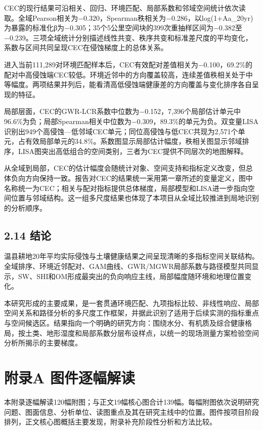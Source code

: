 \documentclass[
  11pt,
  a4paper,
]{ctexart}
\begin{document}
CEC的现行结果可沿相关、回归、环境匹配、局部系数和邻域空间统计依次读取。全域Pearson相关为−0.320，Spearman秩相关为−0.286，以log(1+Aa\_20yr)为暴露的标准化β为−0.305；35个5公里空间块的399次重抽样区间为−0.382至−0.239。三项全域统计分别描述线性共变、秩序共变和标准差尺度的平均变化，系数与区间共同呈现CEC在侵蚀梯度上的总体关系。

进入当前111,289对环境匹配样本后，CEC有效配对差值相关为−0.100，69.2\%的配对中高侵蚀端CEC较低。环境近邻中的方向覆盖较高，连续差值秩相关处于中等幅度。两项结果并列后，能看清高低侵蚀端健康差的方向覆盖与变化排序各自呈现的特征。

局部层面，CEC的GWR-LCR系数中位数为−0.152，7,396个局部估计单元中96.6\%为负；局部Spearman相关中位数为−0.309，89.3\%的单元为负。双变量LISA识别出949个高侵蚀---低邻域CEC单元；同位高侵蚀与低CEC共现为2,571个单元，占有效局部单元的34.8\%。系数图显示局部估计幅度，秩相关图显示邻域排序，LISA图突出高低组合的空间类别，三者为CEC提供不同层次的地图解释。

从全域到局部，CEC的估计幅度会随统计对象、空间支持和指标定义改变，但总体负向方向保持一致。报告对CEC的结果统一采用第一章所述的变量定义，图中名称统一为CEC；相关与配对指标提供总体梯度，局部模型和LISA进一步指向空间位置与邻域结构。这一组多尺度结果也体现了本项目从全域比较推进到局地识别的分析顺序。

\hypertarget{ux7ed3ux8bba}{%
\subsection{2.14 结论}\label{ux7ed3ux8bba}}

温县耕地20年平均实际侵蚀与土壤健康结果之间呈现清晰的多指标空间关联结构。全域排序、环境近邻配对、GAM曲线、GWR/MGWR局部系数与路径模型共同显示，SW、SHI和OM形成最突出的负向响应主线，局部幅度随环境和地理位置变化。

本研究形成的主要成果，是一套贯通环境匹配、九项指标比较、非线性响应、局部空间关系和路径分析的多尺度工作框架，并据此识别了适用于后续实测的指标重点与空间候选区。结果指向一个明确的研究方向：围绕水分、有机质及综合健康格局，按土类、地形湿度和局部系数分层布设样点，以统一的现场测量方案检验空间分析所揭示的主要梯度。

\hypertarget{ux9644ux5f55a-ux56feux4ef6ux9010ux5e45ux89e3ux8bfb}{%
\section{附录A
图件逐幅解读}\label{ux9644ux5f55a-ux56feux4ef6ux9010ux5e45ux89e3ux8bfb}}

本附录逐幅解读120幅附图；与正文19幅核心图合计139幅。每幅附图依次说明研究问题、图面信息、分析单位、读图重点及其在研究主线中的位置。图件按项目阶段排列，正文核心图概括主要发现，附录补充阶段性分析和方法比较。
\end{document}
